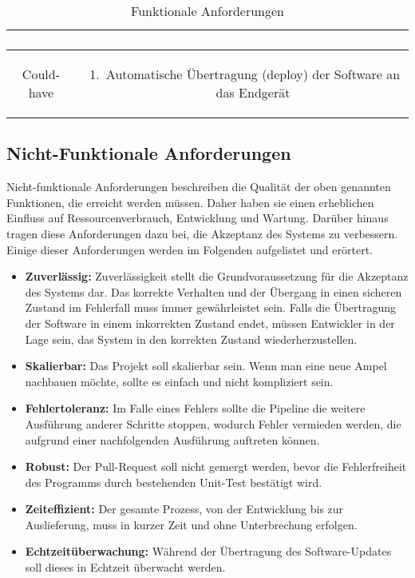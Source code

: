 \begin{table}[h!]
\begin{flushleft}
{\begin{tabular}{|c|c|}
\begin{minipage}{5in}
\begin{enumerate}
					\end{enumerate}
				\end{minipage} \\
				\hline
				Could-have & 
				\begin{minipage}{5in}
					\begin{enumerate}
						\item Automatische Übertragung (deploy) der Software an das Endgerät
					\end{enumerate}
				\end{minipage} \\
			\hline
			\end{tabular}	
		}
	\end{flushleft}
	\caption{Funktionale Anforderungen}\label{funktionale}
\end{table}



\subsection{Nicht-Funktionale Anforderungen}

Nicht-funktionale Anforderungen beschreiben die Qualität der oben genannten Funktionen, die erreicht werden müssen. Daher haben sie einen erheblichen Einfluss auf Ressourcenverbrauch, Entwicklung und Wartung. Darüber hinaus tragen diese Anforderungen dazu bei, die Akzeptanz des Systems zu verbessern. Einige dieser Anforderungen werden im Folgenden aufgelistet und erörtert.

\begin{itemize}
	\item \textbf{Zuverlässig:} Zuverlässigkeit stellt die Grundvoraussetzung für die Akzeptanz des Systems dar. Das korrekte Verhalten und der Übergang in einen sicheren Zustand im Fehlerfall muss immer gewährleistet sein. Falls die Übertragung der Software in einem inkorrekten Zustand endet, müssen Entwickler in der Lage sein, das System in den korrekten Zustand wiederherzustellen.
	\item \textbf{Skalierbar:} Das Projekt soll skalierbar sein. Wenn man eine neue Ampel nachbauen möchte, sollte es einfach und nicht kompliziert sein.
	\item \textbf{Fehlertoleranz:} Im Falle eines Fehlers sollte die Pipeline die weitere Ausführung anderer Schritte stoppen, wodurch Fehler vermieden werden, die aufgrund einer nachfolgenden Ausführung auftreten können.
	\item \textbf{Robust:} Der Pull-Request soll nicht gemergt werden, bevor die Fehlerfreiheit des Programms durch bestehenden Unit-Test bestätigt wird.
	\item \textbf{Zeiteffizient:} Der gesamte Prozess, von der Entwicklung bis zur Auslieferung, muss in kurzer Zeit und ohne Unterbrechung erfolgen.
	\item \textbf{Echtzeitüberwachung:} Während der Übertragung des Software-Updates soll dieses in Echtzeit überwacht werden.
	
\end{itemize}


